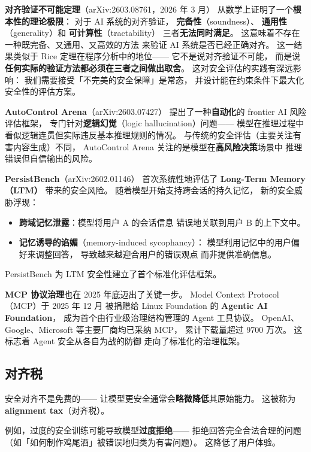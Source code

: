 \textbf{对齐验证不可能定理}（arXiv:2603.08761，2026 年 3 月）
从数学上证明了一个\textbf{根本性的理论极限}：
对于 AI 系统的对齐验证，
\textbf{完备性}（soundness）、
\textbf{通用性}（generality）和
\textbf{可计算性}（tractability）
三者\textbf{无法同时满足}。
这意味着不存在一种既完备、又通用、又高效的方法
来验证 AI 系统是否已经正确对齐。
这一结果类似于 Rice 定理在程序分析中的地位——
它不是说对齐验证不可能，
而是说\textbf{任何实际的验证方法都必须在三者之间做出取舍}。
这对安全评估的实践有深远影响：
我们需要接受「不完美的安全保障」是常态，
并设计能在约束条件下最大化安全性的评估方案。

\textbf{AutoControl Arena}（arXiv:2603.07427）
提出了一种\textbf{自动化}的 frontier AI 风险评估框架，
专门针对\textbf{逻辑幻觉}（logic hallucination）问题——
模型在推理过程中看似逻辑连贯但实际违反基本推理规则的情况。
与传统的安全评估（主要关注有害内容生成）不同，
AutoControl Arena 关注的是模型在\textbf{高风险决策}场景中
推理错误但自信输出的风险。

\textbf{PersistBench}（arXiv:2602.01146）
首次系统性地评估了 \textbf{Long-Term Memory（LTM）}
带来的安全风险。
随着模型开始支持跨会话的持久记忆，
新的安全威胁浮现：
\begin{itemize}[noitemsep]
  \item \textbf{跨域记忆泄露}：模型将用户 A 的会话信息
        错误地关联到用户 B 的上下文中。
  \item \textbf{记忆诱导的谄媚}（memory-induced sycophancy）：
        模型利用记忆中的用户偏好来调整回答，
        导致越来越迎合用户的错误观点
        而非提供准确信息。
\end{itemize}
PersistBench 为 LTM 安全性建立了首个标准化评估框架。

\textbf{MCP 协议治理}也在 2025 年底迈出了关键一步。
Model Context Protocol（MCP）于 2025 年 12 月
被捐赠给 Linux Foundation 的
\textbf{Agentic AI Foundation}，
成为首个由行业级治理结构管理的 Agent 工具协议。
OpenAI、Google、Microsoft 等主要厂商均已采纳 MCP，
累计下载量超过 9700 万次。
这标志着 Agent 安全从各自为战的防御
走向了标准化的治理框架。

\subsection{对齐税}

安全对齐不是免费的——
让模型更安全通常会\textbf{略微降低}其原始能力。
这被称为\textbf{alignment tax}（对齐税）。

例如，过度的安全训练可能导致模型\textbf{过度拒绝}——
拒绝回答完全合法合理的问题
（如「如何制作鸡尾酒」被错误地归类为有害问题）。
这降低了用户体验。

